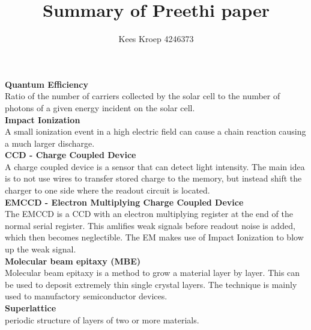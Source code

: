 \documentclass{article}
\title{Summary of Preethi paper}
\author{Kees Kroep 4246373}
\begin{document}
  \maketitle

  \textbf{Quantum Efficiency}\\
  Ratio of the number of carriers collected by the solar cell to the number of photons of a given energy incident on the solar cell.
\\

\textbf{Impact Ionization}\\
A small ionization event in a high electric field can cause a chain reaction causing a much larger discharge.\\

\textbf{CCD - Charge Coupled Device}\\
A charge coupled device is a sensor that can detect light intensity. The main idea is to not use wires to transfer stored charge to the memory, but instead shift the charger to one side where the readout circuit is located.\\

  \textbf{EMCCD - Electron Multiplying Charge Coupled Device}\\
The EMCCD is a CCD with an electron multiplying register at the end of the normal serial register. This amlifies weak signals before readout noise is added, which then becomes neglectible. The EM makes use of Impact Ionization to blow up the weak signal. \\

\textbf{Molecular beam epitaxy (MBE)}\\
Molecular beam epitaxy is a method to grow a material layer by layer. This can be used to deposit extremely thin single crystal layers. The technique is mainly used to manufactory semiconductor devices.\\

\textbf{Superlattice}\\
periodic structure of layers of two or more materials. \\


	  


  
\end{document}
